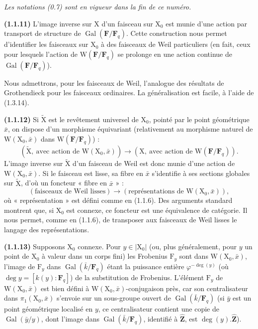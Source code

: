 \documentclass[11pt,leqno]{article}
\begin{document}
\textit{Les notations \textup{(0.7)} sont en vigueur dans la fin de ce numéro.}

\textbf{(1.1.11)} L’image inverse sur \(\mathrm{X}\) d’un faisceau sur \(\mathrm{X}_0\) est munie d’une action par transport de structure de \(\operatorname{Gal}(\mathbf{F}/\mathbf{F}_q)\). Cette construction nous permet d’identifier les faisceaux sur \(\mathrm{X}_0\) à des faisceaux de Weil particuliers (en fait, ceux pour lesquels l’action de \(\mathrm{W}(\mathbf{F}/\mathbf{F}_q)\) se prolonge en une action continue de \(\operatorname{Gal}(\mathbf{F}/\mathbf{F}_q)\)).

Nous admettrons, pour les faisceaux de Weil, l’analogue des résultats de Grothendieck pour les faisceaux ordinaires. La généralisation est facile, à l’aide de (1.3.14).

\textbf{(1.1.12)} Si \(\widetilde{\mathrm{X}}\) est le revêtement universel de \(\mathrm{X}_0\), pointé par le point géométrique \(\bar x\), on dispose d’un morphisme équivariant (relativement au morphisme naturel de \(\mathrm{W}(\mathrm{X}_0,\bar x)\) dans \(\mathrm{W}(\mathbf{F}/\mathbf{F}_q)\)) :
\[
(\widetilde{\mathrm{X}},\ \text{avec action de }\mathrm{W}(\mathrm{X}_0,\bar x))
\to
(\mathrm{X},\ \text{avec action de }\mathrm{W}(\mathbf{F}/\mathbf{F}_q)).
\]
L’image inverse sur \(\widetilde{\mathrm{X}}\) d’un faisceau de Weil est donc munie d’une action de \(\mathrm{W}(\mathrm{X}_0,\bar x)\). Si le faisceau est lisse, sa fibre en \(\bar x\) s’identifie à ses sections globales sur \(\widetilde{\mathrm{X}}\), d’où un foncteur « fibre en \(\bar x\) » :
\[
(\text{faisceaux de Weil lisses})
\to
(\text{représentations de }\mathrm{W}(\mathrm{X}_0,\bar x)),
\]
où « représentation » est défini comme en (1.1.6). Des arguments standard montrent que, si \(\mathrm{X}_0\) est connexe, ce foncteur est une équivalence de catégorie. Il nous permet, comme en (1.1.6), de transposer aux faisceaux de Weil lisses le langage des représentations.

\textbf{(1.1.13)} Supposons \(\mathrm{X}_0\) connexe. Pour \(y\in|\mathrm{X}_0|\) (ou, plus généralement, pour \(y\) un point de \(\mathrm{X}_0\) à valeur dans un corps fini) les Frobenius \(\mathrm{F}_y\) sont dans \(\mathrm{W}(\mathrm{X}_0,\bar x)\), l’image de \(\mathrm{F}_y\) dans \(\operatorname{Gal}(\bar k/\mathbf{F}_q)\) étant la puissance entière \(\varphi^{-\deg(y)}\) (où \(\deg y=[k(y):\mathbf{F}_q]\)) de la substitution de Frobenius. L’élément \(\mathrm{F}_y\) de \(\mathrm{W}(\mathrm{X}_0,\bar x)\) est bien défini à \(\mathrm{W}(\mathrm{X}_0,\bar x)\)-conjugaison près, car son centralisateur dans \(\pi_1(\mathrm{X}_0,\bar x)\) s’envoie sur un sous-groupe ouvert de \(\operatorname{Gal}(\bar k/\mathbf{F}_q)\) (si \(\bar y\) est un point géométrique localisé en \(y\), ce centralisateur contient une copie de \(\operatorname{Gal}(\bar y/y)\), dont l’image dans \(\operatorname{Gal}(\bar k/\mathbf{F}_q)\), identifié à \(\widehat{\mathbf{Z}}\), est \(\deg(y).\widehat{\mathbf{Z}}\)).
\end{document}
